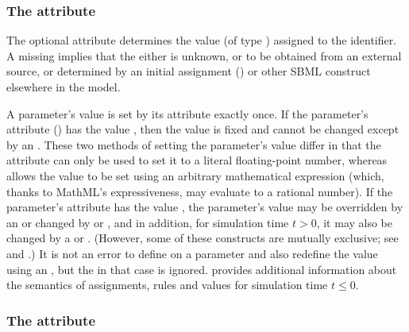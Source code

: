 

\subsubsection{The  attribute}
\label{sec:parameter-value}

The optional attribute  determines the value (of type
) assigned to the identifier.  A missing
 implies that the  either is unknown, or
to be obtained from an external source, or determined by an
initial assignment () or 
other SBML construct elsewhere in the model.

A parameter's value is set by its  attribute exactly
once.  If the parameter's  attribute
() has the value ,
then the value is fixed and cannot be changed except by an
\InitialAssignment.  These two methods of setting the parameter's
value differ in that the  attribute can only be used
to set it to a literal floating-point number, whereas
\InitialAssignment allows the value to be set using an arbitrary
mathematical expression (which, thanks to MathML's expressiveness,
may evaluate to a rational number).  If the parameter's
 attribute has the value , the
parameter's value may be overridden by an \InitialAssignment or
changed by \AssignmentRule or \AlgebraicRule, and in addition, for
simulation time $t > 0$, it may also be changed by a \RateRule or
\Event.  (However, some of these constructs are mutually
exclusive; see  and .)  It
is not an error to define  on a parameter and also
redefine the value using an \InitialAssignment, but the
 in that case is ignored.
 provides additional information about
the semantics of assignments, rules and values for simulation time
$t \leq 0$.


\subsubsection{The  attribute}
\label{sec:parameter-units}

